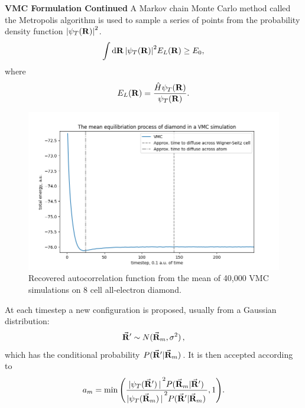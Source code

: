 \documentclass[10pt]{beamer}
\begin{document}
\begin{frame}[allowframebreaks]
    \textbf{VMC Formulation Continued}\medskip\newline
    A Markov chain Monte Carlo method called the Metropolis algorithm is used to sample a series of points from the probability density function $\vqty{\psi_T\pqty{\vb{R}}}^2$.\medskip\newline
    \begin{equation}
        \int\dd{\vb{R}}
        \vqty{\psi_T\pqty{\vb{R}}}^2
        E_L\pqty{\vb{R}}
        \geq E_0,
    \end{equation}
    where
    \begin{equation}
        E_L\pqty{\vb{R}}=\frac{\hat{H}\psi_T\pqty{\vb{R}}}{\psi_T\pqty{\vb{R}}}.
    \end{equation}
    \framebreak%

    \begin{figure}
        \centering
        \includegraphics[scale=0.37]{./images/control_process_diamond_ae2.png}
        \caption{Recovered autocorrelation function from the mean of 40,000
        VMC simulations on 8 cell all-electron diamond.}
    \end{figure}
    \framebreak%

    At each timestep a new configuration is proposed, usually from a Gaussian distribution:
    \begin{equation}
        \va{R}'\sim N\pqty*{\va{R}_m,\sigma^2},
    \end{equation}
    which has the conditional probability $P\pqty*{\va{R}'|\va{R}_m}$. It is then accepted according to
    \begin{equation}
        a_m=\min\pqty{\frac{\vqty*{\psi_T\pqty*{\va{R}'}}^2P\pqty*{\va{R}_m|\va{R}'}}{\vqty*{\psi_T\pqty*{\va{R}_m}}^2P\pqty*{\va{R}'|\va{R}_m}},1}.
    \end{equation}
    \framebreak%


\end{frame}
\end{document}
